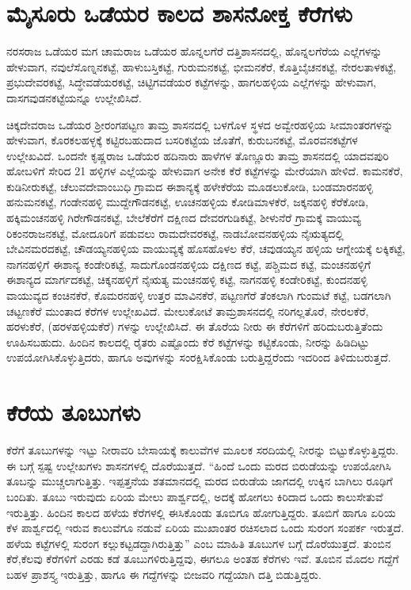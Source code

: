 \section{ಮೈಸೂರು ಒಡೆಯರ ಕಾಲದ ಶಾಸನೋಕ್ತ ಕೆರೆಗಳು}

ನರಸರಾಜ ಒಡೆಯರ ಮಗ ಚಾಮರಾಜ ಒಡೆಯರ ಹೊನ್ನಲಗೆರೆ ದತ್ತಿಶಾಸನದಲ್ಲಿ, ಹೊನ್ನಲಗೆರೆಯ ಎಲ್ಲೆಗಳನ್ನು ಹೇಳುವಾಗ, ನವುಲೆಸೊಣ್ನನಕಟ್ಟೆ, ಹಾಳುಬಸ್ತಿಕಟ್ಟೆ, ಗುರುಮನಕಟ್ಟೆ, ಭೀಮನಕೆರೆ, ಕೊತ್ತಿಬೈಚನಕಟ್ಟೆ, ನೇರಲತಾಳಕಟ್ಟೆ, ಪ್ರಭುದೇವರಕಟ್ಟೆ, ಸಿದ್ಧೇವಡೆಯರಕಟ್ಟೆ, ಚಿಟ್ಟಿಗವಡೆಯರ ಕಟ್ಟೆಗಳನ್ನು, ಹಾಗಲಹಳ್ಳಿಯ ಎಲ್ಲೆಗಳನ್ನು ಹೇಳುವಾಗ, ದಾಸಗವುಡನಕಟ್ಟೆಯನ್ನೂ ಉಲ್ಲೇಖಿಸಿದೆ.

ಚಿಕ್ಕದೇವರಾಜ ಒಡೆಯರ ಶ‍್ರೀರಂಗಪಟ್ಟಣ ತಾಮ್ರ ಶಾಸನದಲ್ಲಿ ಬಳಗೊಳ ಸ್ಥಳದ ಅವ್ವೇರಹಳ್ಳಿಯ ಸೀಮಾಂತರಗಳನ್ನು ಹೇಳುವಾಗ, ಕೊರಕಲಹಳ್ಳಕ್ಕೆ ಕಟ್ಟಿರಬಹುದಾದ ಬಸರಿಕಟ್ಟೆಯ ಜೊತೆಗೆ, ಕುರುಬನಕಟ್ಟೆ, ಮೊರವನಕಟ್ಟೆಗಳ ಉಲ್ಲೇಖವಿದೆ. ಒಂದನೇ ಕೃಷ್ಣರಾಜ ಒಡೆಯರ ಹದಿನಾರು ಹಾಳೆಗಳ ತೊಣ್ಣೂರು ತಾಮ್ರ ಶಾಸನದಲ್ಲಿ ಯಾದವಪುರಿ ಹೋಬಳಿಗೆ ಸೇರಿದ 21 ಹಳ್ಳಿಗಳ ಎಲ್ಲೆಯನ್ನು ಹೇಳುವಾಗ ಅನೇಕ ಕೆರೆ ಕಟ್ಟೆಗಳನ್ನು ಮೇರೆಯಾಗಿ ಹೇಳಿದೆ. ಕಾಮನಕೆರೆ, ಕುಡಿನೀರುಕಟ್ಟೆ, ಚೆಲುವದೇವಾಂಬುಧಿ ಗ್ರಾಮದ ಈಶಾನ್ಯಕ್ಕೆ ಹಳೇಕೆರೆಯ ಮೂಡಲುಕೋಡಿ, ಬಂಡಮಾರನಹಳ್ಳಿ ಹನುಮನಕಟ್ಟೆ, ಗಂಡೇನಹಳ್ಳಿ ಮುದ್ದೇಗೌಡನಕಟ್ಟೆ, ಊಚನಹಳ್ಳಿಯ ಕೋಡಿಮಾಳಕೆರೆ, ಜಕ್ಕನಹಳ್ಳಿ ಕೆರೆಕೋಡಿ, ಹಕ್ಕಿಮಂಚನಹಳ್ಳಿ ಗಿರೇಗೌಡನಕಟ್ಟೆ, ಬೇಲೆಕೆರೆಗೆ ದಕ್ಷಿಣದ ದೇವರಗುಡಿಕಟ್ಟೆ, ಶೀಳುನೆರೆ ಗ್ರಾಮಕ್ಕೆ ವಾಯುವ್ಯ ರಿಕಂನರಾಜನಕಟ್ಟೆ, ಮೋದೂರಿಗೆ ಪಡುವಲು ರಾಮದೇವರಕಟ್ಟೆ, ನಾಡಬೋವನಹಳ್ಳಿಯ ನೈಋತ್ಯದಲ್ಲಿ ಬೇವಿನಮರದಕಟ್ಟೆ, ಚೌಡಯ್ಯನಹಳ್ಳಿಯ ವಾಯುವ್ಯಕ್ಕೆ ಹೊಸಹೊಳಲ ಕೆರೆ, ಚವುಡಯ್ಯನ ಹಳ್ಳಿಯ ಆಗ್ನೇಯಕ್ಕೆ ಲಕ್ಕಿಕಟ್ಟೆ, ನಾಗನಹಳ್ಳಿಗೆ ಈಶಾನ್ಯ ಕಂಡೇರಿಕಟ್ಟೆ, ಸಾದುಗೊಂಡನಹಳ್ಳಿಯ ದಕ್ಷಿಣದ ಕಟ್ಟೆ, ಪಶ್ಚಿಮದ ಕಟ್ಟೆ, ಮಂಚನಹಳ್ಳಿಗೆ ಈಶಾನ್ಯದ ಮಾರ್ಗದಕಟ್ಟೆ, ಚಿಕ್ಕನಹಳ್ಳಿಗೆ ನೈಋತ್ಯ ಮಂಚನಹಳ್ಳಿ ಕಟ್ಟೆ, ನಾಗನಹಳ್ಳಿ ಕಂಡೇರಿಕಟ್ಟೆ, ಕುಂದನಹಳ್ಳಿ ವಾಯುವ್ಯದ ಕಂಚಿನಕೆರೆ, ಕೊಮರನಹಳ್ಳಿ ಉತ್ತರ ಮಾವಿನಕೆರೆ, ಪಟ್ಟಣಗೆರೆ ತೆಂಕಲಾಗಿ ಗುಂಮಟೆ ಕಟ್ಟೆ, ಬಡಗಲಾಗಿ ಚಟ್ಟಣಕೆರೆ ಮುಂತಾದ ಕೆರೆಗಳ ಉಲ್ಲೇಖವಿದೆ. ಮೇಲುಕೋಟೆ ತಾಮ್ರಶಾಸನದಲ್ಲಿ ನರಿಗಲ್ಲತೊರೆ, ನೇರಲಕೆರೆ, ಹರಳುಕೆರೆ, (ಹರಳಹಳ್ಳಿಯಕೆರೆ) ಗಳನ್ನು ಉಲ್ಲೇಖಿಸಿದೆ. ಈ ತೊರೆಯ ನೀರು ಈ ಕೆರೆಗಳಿಗೆ ಹರಿದುಬರುತ್ತಿತೆಂದು ಊಹಿಸಬಹುದು. ಹಿಂದಿನ ಕಾಲದಲ್ಲಿ ರೈತರು ಎಷ್ಟೊಂದು ಕೆರೆ ಕಟ್ಟೆಗಳನ್ನು ಕಟ್ಟಿಕೊಂಡು, ನೀರನ್ನು ಹಿಡಿದಿಟ್ಟು ಉಪಯೋಗಿಸಿಕೊಳ್ಳುತ್ತಿದರು, ಹಾಗೂ ಅವುಗಳನ್ನು ಸಂರಕ್ಷಿಸಿಕೊಂಡು ಬರುತ್ತಿದ್ದರೆಂದು ಇದರಿಂದ ತಿಳಿದುಬರುತ್ತದೆ.


\section{ಕೆರೆಯ ತೂಬುಗಳು}

ಕೆರೆಗೆ ತೂಬುಗಳನ್ನು ಇಟ್ಟು ನೀರಾವರಿ ಬೇಸಾಯಕ್ಕೆ ಕಾಲುವೆಗಳ ಮೂಲಕ ಸರದಿಯಲ್ಲಿ ನೀರನ್ನು ಬಿಟ್ಟುಕೊಳ್ಳುತ್ತಿದ್ದರು. ಈ ಬಗ್ಗೆ ಸ್ಪಷ್ಟ ಉಲ್ಲೇಖಗಳು ಶಾಸನಗಳಲ್ಲಿ ದೊರೆಯುತ್ತದೆ. “ಹಿಂದೆ ಒಂದು ಮರದ ಬಿರುಡೆಯನ್ನು ಉಪಯೋಗಿಸಿ ತೂಬನ್ನು ಮುಚ್ಚಲಾಗುತ್ತಿತ್ತು. ಇಪ್ಪತ್ತನೆಯ ಶತಮಾನದಲ್ಲಿ ಮರದ ಬಿರುಡೆಯ ಜಾಗದಲ್ಲಿ ಉಕ್ಕಿನ ಬಾಗಿಲು ರೂಢಿಗೆ ಬಂದಿತು. ತೂಬು ಇರುವುದು ಏರಿಯ ಮೇಲು ಪಾರ್ಶ್ವದಲ್ಲಿ, ಅದಕ್ಕೆ ಹೋಗಲು ಕಿರಿದಾದ ಒಂದು ಕಾಲುಸೇತುವೆ ಇರುತ್ತಿತ್ತು. ಹಿಂದಿನ ಕಾಲದ ಹಳೆಯ ಕೆರೆಗಳಲ್ಲಿ ಈಸಿಕೊಂಡು ತೂಬಿಗೂ ಹೋಗುತ್ತಿದ್ದರು. ತೂಬಿಗೆ ಹಾಗೂ ಏರಿಯ ಕೆಳ ಪಾರ್ಶ್ವದಲ್ಲಿ ಇರುವ ಕಾಲುವೆಗೂ ನಡುವೆ ಏರಿಯ ಮುಖಾಂತರ ರಚಿಸಲಾದ ಒಂದು ಸುರಂಗ ಸಂಪರ್ಕ ಇರುತ್ತದೆ. ಹಳೆಯ ಕಟ್ಟೆಗಳಲ್ಲಿ ಸುರಂಗ ಕಲ್ಲುಕಟ್ಟಡದ್ದಾಗಿರುತ್ತಿತ್ತು” ಎಂಬ ಮಾಹಿತಿ ತೂಬುಗಳ ಬಗ್ಗೆ ದೊರೆಯುತ್ತದೆ. ತುಂಬಿನ ಕೆರೆ,ಕೆಲವು ಕೆರೆಗಳಿಗೆ ಎರಡು ಕಡೆ ತೂಬುಗಳಿರುತ್ತಿದ್ದವು, ಈಗಲೂ ಅಂತಹ ಕೆರೆಗಳು ಇವೆ. ತೂಬಿನ ಮೊದಲ ಗದ್ದೆಗೆ ಬಹಳ ಪ್ರಾಶಸ್ತ್ಯ ಇರುತ್ತಿತ್ತು, ಹಾಗೂ ಈ ಗದ್ದೆಗಳನ್ನು ಬೀಜವರಿ ಗದ್ದೆಯಾಗಿ ದತ್ತಿ ಬಿಡುತ್ತಿದ್ದರು.

